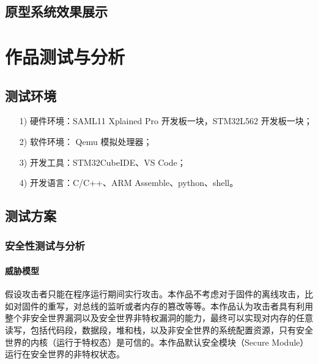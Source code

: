 \documentclass[12pt,a4paper]{ctexart}
\numberwithin{figure}{section}
\begin{document}
\subsection{原型系统效果展示}

\section{作品测试与分析}
\subsection{测试环境}
\begin{itemize}
    \item[1)] 硬件环境：SAML11 Xplained Pro 开发板一块，STM32L562 开发板一块；
    \item[2)] 软件环境： Qemu 模拟处理器；
    \item[3)] 开发工具：STM32CubeIDE、VS Code；
    \item[4)] 开发语言：C/C++、ARM Assemble、python、shell。
\end{itemize}
\subsection{测试方案}
\subsubsection{安全性测试与分析}
\paragraph{威胁模型}
\par 假设攻击者只能在程序运行期间实行攻击。本作品不考虑对于固件的离线攻击，比如对固件的重写，对总线的监听或者内存的篡改等等。本作品认为攻击者具有利用整个非安全世界漏洞以及安全世界非特权漏洞的能力，最终可以实现对内存的任意读写，包括代码段，数据段，堆和栈，以及非安全世界的系统配置资源，只有安全世界的内核（运行于特权态）是可信的。本作品默认安全模块（Secure Module）运行在安全世界的非特权状态。
\end{document}
